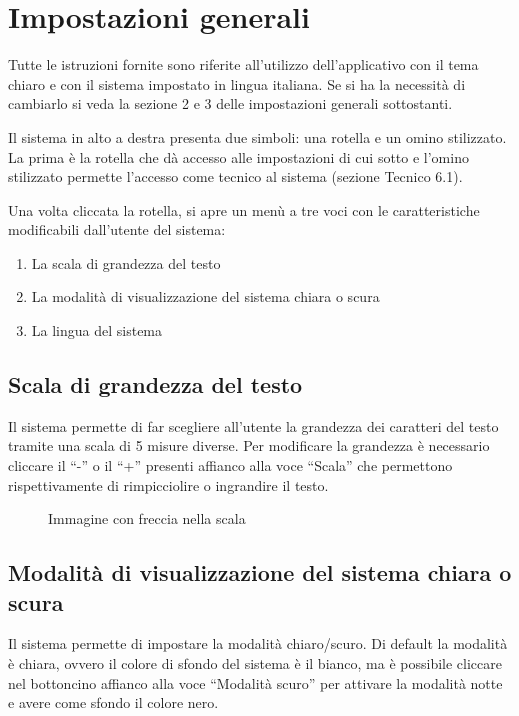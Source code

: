 \section{Impostazioni generali}

Tutte le istruzioni fornite sono riferite all'utilizzo dell'applicativo con il tema chiaro e con il sistema impostato in lingua italiana. Se si ha la necessità di cambiarlo si veda la sezione 2 e 3 delle impostazioni generali sottostanti.

Il sistema in alto a destra presenta due simboli: una rotella e un omino stilizzato. La prima è la rotella che dà accesso alle impostazioni di cui sotto e l'omino stilizzato permette l'accesso come tecnico al sistema (sezione Tecnico 6.1).

Una volta cliccata la rotella, si apre un menù a tre voci con le caratteristiche modificabili dall'utente del sistema:
\begin{enumerate}
    \item La scala di grandezza del testo
    \item La modalità di visualizzazione del sistema chiara o scura
    \item La lingua del sistema
\end{enumerate}

\subsection{Scala di grandezza del testo}

Il sistema permette di far scegliere all'utente la grandezza dei caratteri del testo tramite una scala di 5 misure diverse. Per modificare la grandezza è necessario cliccare il ``-'' o il ``+'' presenti affianco alla voce ``Scala'' che permettono rispettivamente di rimpicciolire o ingrandire il testo.

\begin{figure}[H]
    \centering
    \caption{Immagine con freccia nella scala}
  \end{figure}

\subsection{Modalità di visualizzazione del sistema chiara o scura}

Il sistema permette di impostare la modalità chiaro/scuro. Di default la modalità è chiara, ovvero il colore di sfondo del sistema è il bianco, ma è possibile cliccare nel bottoncino affianco alla voce ``Modalità scuro'' per attivare la modalità notte e avere come sfondo il colore nero.


